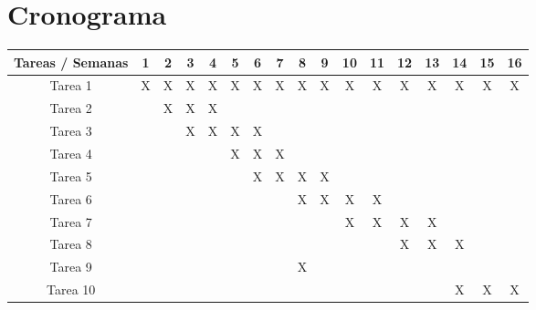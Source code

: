 \documentclass[letterpaper,12pt]{extarticle}
\begin{document}
\section{Cronograma}

\begin{center}
\begin{tabular}{c|cccccccccccccccc}
Tareas / Semanas & 1&2&3&4&5&6&7&8&9&10&11&12&13&14&15&16 \\
\hline
Tarea 1 & X&X&X&X&X&X&X&X&X&X&X&X&X&X&X&X \\
Tarea 2 &  &X&X&X& & & & & & & & & & & & \\
Tarea 3 &  & &X&X&X&X& & & & & & & & & & \\
Tarea 4 &  & & & &X&X&X& & & & & & & & & \\
Tarea 5 &  & & & & &X&X&X&X& & & & & & & \\
Tarea 6 &  & & & & & & &X&X&X&X& & & & & \\
Tarea 7 &  & & & & & & & & &X&X&X&X& & & \\
Tarea 8 &  & & & & & & & & & & &X&X&X& & \\
Tarea 9 &  & & & & & & &X& & & & & & & & \\
Tarea 10&  & & & & & & & & & & & & &X&X&X 
\end{tabular}
\end{center}

\vspace{4mm}
\end{document}
